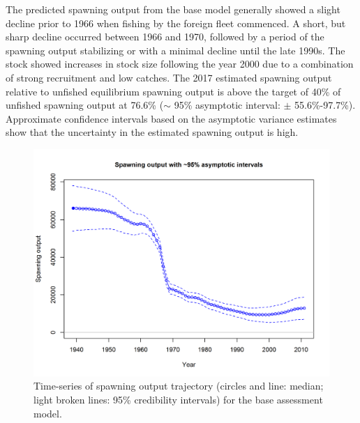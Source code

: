 \documentclass[12pt,]{article}
\begin{document}
The predicted spawning output from the base model generally showed a
slight decline prior to 1966 when fishing by the foreign fleet
commenced. A short, but sharp decline occurred between 1966 and 1970,
followed by a period of the spawning output stabilizing or with a
minimal decline until the late 1990s. The stock showed increases in
stock size following the year 2000 due to a combination of strong
recruitment and low catches. The 2017 estimated spawning output relative
to unfished equilibrium spawning output is above the target of 40\% of
unfished spawning output at 76.6\% (\(\sim\) 95\% asymptotic interval:
\(\pm\) 55.6\%-97.7\%). Approximate confidence intervals based on the
asymptotic variance estimates show that the uncertainty in the estimated
spawning output is high.

\begin{figure}
\centering
\includegraphics{r4ss/plots_mod1/ts7_Spawning_output_with_95_asymptotic_intervals_intervals.png}
\caption{Time-series of spawning output trajectory (circles and line:
median; light broken lines: 95\% credibility intervals) for the base
assessment model. \label{fig:Spawnbio_all}}
\end{figure}
\end{document}
